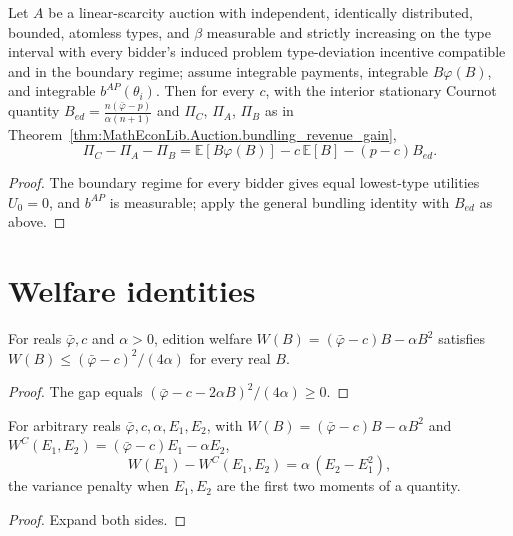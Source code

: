 \begin{theorem}\label{thm:MathEconLib.LinearScarcityAuction.bundling_revenue_gain_of_isBoundaryRegime}
\leanok
{}
Let $A$ be a linear-scarcity auction with independent, identically distributed, bounded, atomless types, and $\beta$ measurable and strictly increasing on the type interval with every bidder's induced problem type-deviation incentive compatible and in the boundary regime; assume integrable payments, integrable $B\varphi(B)$, and integrable $b^{AP}(\theta_i)$. Then for every $c$, with the interior stationary Cournot quantity $B_{ed} = \frac{n(\bar\varphi - p)}{\alpha(n+1)}$ and $\Pi_C$, $\Pi_A$, $\Pi_B$ as in Theorem~\ref{thm:MathEconLib.Auction.bundling_revenue_gain},
\[
  \Pi_C - \Pi_A - \Pi_B = \mathbb E[B\varphi(B)] - c\,\mathbb E[B] - (p-c)B_{ed}.
\]
\end{theorem}
\begin{proof}
\leanok
{}
The boundary regime for every bidder gives equal lowest-type utilities $U_0 = 0$, and $b^{AP}$ is measurable; apply the general bundling identity with $B_{ed}$ as above.
\end{proof}

\section{Welfare identities}

\begin{theorem}\label{thm:MathEconLib.AllPurchase.editionWelfare_le_firstBest}
\leanok
For reals $\bar\varphi, c$ and $\alpha > 0$, edition welfare $W(B) = (\bar\varphi - c)B - \alpha B^2$ satisfies $W(B) \le (\bar\varphi - c)^2/(4\alpha)$ for every real $B$.
\end{theorem}
\begin{proof}
\leanok
The gap equals $(\bar\varphi - c - 2\alpha B)^2/(4\alpha) \ge 0$.
\end{proof}

\begin{theorem}\label{thm:MathEconLib.AllPurchase.editionWelfare_mean_sub_bundled}
\leanok
For arbitrary reals $\bar\varphi, c, \alpha, E_1, E_2$, with $W(B) = (\bar\varphi - c)B - \alpha B^2$ and $W^C(E_1,E_2) = (\bar\varphi - c)E_1 - \alpha E_2$,
\[
  W(E_1) - W^C(E_1,E_2) = \alpha\,(E_2 - E_1^2),
\]
the variance penalty when $E_1, E_2$ are the first two moments of a quantity.
\end{theorem}
\begin{proof}
\leanok
Expand both sides.
\end{proof}

